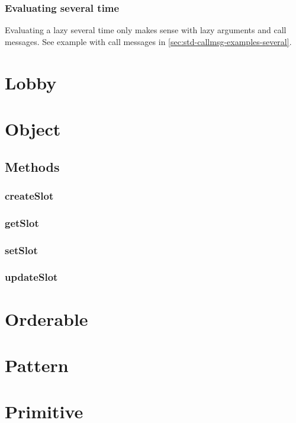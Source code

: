 \subsubsection{Evaluating several time}

Evaluating a lazy several time only makes sense with lazy arguments
and call messages. See example with call messages in
\autoref{sec:std-callmsg-examples-several}.



\section{Lobby}
\section{Object}
\label{sec:std-object}

\subsection{Methods}

\subsubsection{createSlot}
\label{sec:std-object-createslot}

\subsubsection{getSlot}
\label{sec:std-object-getslot}

\subsubsection{setSlot}
\label{sec:std-object-setslot}

\subsubsection{updateSlot}
\label{sec:std-object-updateslot}

\section{Orderable}
\section{Pattern}
\section{Primitive}
